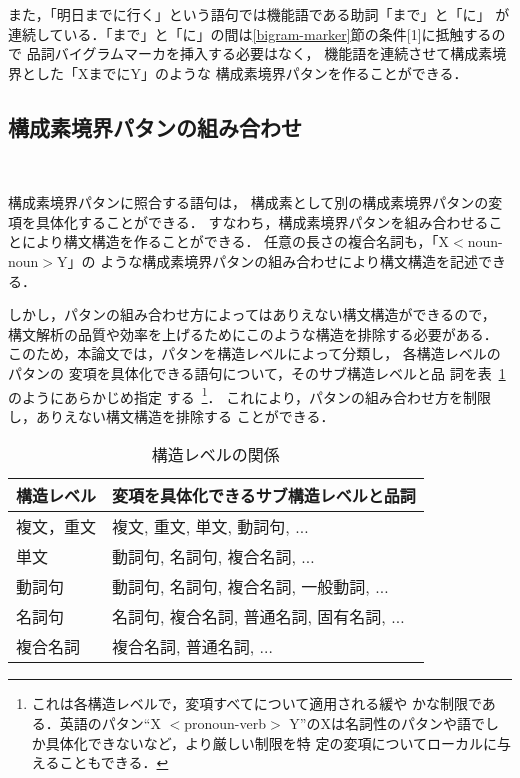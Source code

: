 また，「明日までに行く」という語句では機能語である助詞「まで」と「に」
が連続している．「まで」と「に」の間は\ref{bigram-marker}節の条件[1]に抵触するので
品詞バイグラムマーカを挿入する必要はなく，
機能語を連続させて構成素境界とした「XまでにY」のような
構成素境界パタンを作ることができる．

\subsection{構成素境界パタンの組み合わせ}~\label{combination}

構成素境界パタンに照合する語句は，
構成素として別の構成素境界パタンの変項を具体化することができる．
すなわち，構成素境界パタンを組み合わせることにより構文構造を作ることができる．
任意の長さの複合名詞も，「X{\footnotesize $<$}noun-noun{\footnotesize $>$}Y」の
ような構成素境界パタンの組み合わせにより構文構造を記述できる．

しかし，パタンの組み合わせ方によってはありえない構文構造ができるので，
構文解析の品質や効率を上げるためにこのような構造を排除する必要がある．
このため，本論文では，パタンを構造レベルによって分類し，
各構造レベルのパタンの
変項を具体化できる語句について，そのサブ構造レベルと品
詞を表~\ref{var}のようにあらかじめ指定
する~\footnote{これは各構造レベルで，変項すべてについて適用される緩や
かな制限である．英語のパタン``X {\footnotesize $<$}pronoun-verb{\footnotesize $>$}
Y''のXは名詞性のパタンや語でしか具体化できないなど，より厳しい制限を特
定の変項についてローカルに与えることもできる．}．
これにより，パタンの組み合わせ方を制限し，ありえない構文構造を排除する
ことができる．

\renewcommand{\arraystretch}{}
\begin{table}[tbh]
\begin{center}
 \caption{構造レベルの関係}
 \label{var}
 \begin{small}
\begin{tabular}{|l|l|} \hline
         構造レベル & 変項を具体化できるサブ構造レベルと品詞 \\  \hline
        複文，重文 & 複文, 重文, 単文, 動詞句, $\ldots$\\
        単文 & 動詞句, 名詞句, 複合名詞, $\ldots$\\
        動詞句  &  動詞句,  名詞句, 複合名詞, 一般動詞, $\ldots$\\
        名詞句  &  名詞句, 複合名詞,  普通名詞, 固有名詞, $\ldots$ \\
        複合名詞 &  複合名詞, 普通名詞, $\ldots$ \\  \hline
\end{tabular}
\end{small}
\end{center}
\end{table}


